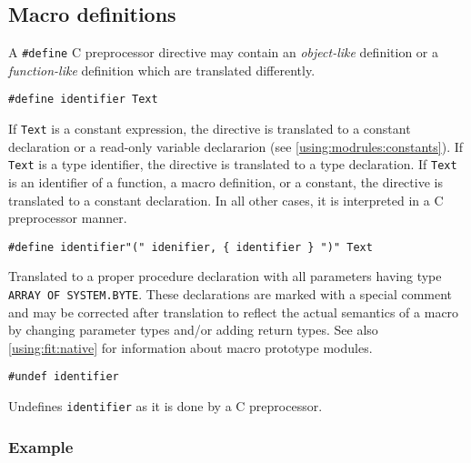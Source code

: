 \subsection{Macro definitions}
\label{rules:pp:define}

A {\tt \#define} C preprocessor directive may contain an {\em object-like}
definition or a {\em function-like} definition which are translated
differently.

\verb'#define identifier Text'

If {\tt Text} is a constant expression, the directive is translated to
a constant declaration or a read-only variable declararion
(see \ref{using:modrules:constants}).
If {\tt Text} is a type identifier, the directive is translated to
a type declaration. If {\tt Text} is an identifier of a function, a macro
definition, or a constant, the directive is translated to a constant declaration.
In all other cases, it is interpreted in a C preprocessor manner.

\verb'#define identifier"(" idenifier, { identifier } ")" Text'

Translated to a proper procedure declaration with all parameters having
type {\tt ARRAY OF SYSTEM.BYTE}. These declarations are marked with a special
comment and may be corrected after translation to reflect the actual semantics
of a macro by changing parameter types and/or adding return types.
See also \ref{using:fit:native} for information about macro prototype modules.

\verb'#undef identifier'

Undefines {\tt identifier} as it is done by a C preprocessor.

\subsubsection*{Example}

